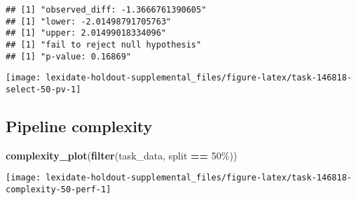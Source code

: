 \documentclass[
]{book}
\newenvironment{Shaded}{\begin{snugshade}}{\end{snugshade}}
\newcommand{\AttributeTok}[1]{\textcolor[rgb]{0.13,0.29,0.53}{#1}}
\newcommand{\DecValTok}[1]{\textcolor[rgb]{0.00,0.00,0.81}{#1}}
\newcommand{\FunctionTok}[1]{\textcolor[rgb]{0.13,0.29,0.53}{\textbf{#1}}}
\newcommand{\NormalTok}[1]{#1}
\newcommand{\OtherTok}[1]{\textcolor[rgb]{0.56,0.35,0.01}{#1}}
\newcommand{\SpecialCharTok}[1]{\textcolor[rgb]{0.81,0.36,0.00}{\textbf{#1}}}
\newcommand{\StringTok}[1]{\textcolor[rgb]{0.31,0.60,0.02}{#1}}
\begin{document}
\begin{Shaded}
\end{Shaded}

\begin{verbatim}
## [1] "observed_diff: -1.3666761390605"
## [1] "lower: -2.01498791705763"
## [1] "upper: 2.01499018334096"
## [1] "fail to reject null hypothesis"
## [1] "p-value: 0.16869"
\end{verbatim}

\texttt{[image: lexidate-holdout-supplemental\_files/figure-latex/task-146818-select-50-pv-1]}

\hypertarget{pipeline-complexity-2}{%
\subsection{Pipeline complexity}\label{pipeline-complexity-2}}

\begin{Shaded}
\begin{Highlighting}[]
\FunctionTok{complexity\_plot}\NormalTok{(}\FunctionTok{filter}\NormalTok{(task\_data, split }\SpecialCharTok{==} \StringTok{\textquotesingle{}50\%\textquotesingle{}}\NormalTok{))}
\end{Highlighting}
\end{Shaded}

\texttt{[image: lexidate-holdout-supplemental\_files/figure-latex/task-146818-complexity-50-perf-1]}
\end{document}
